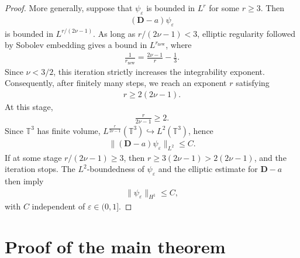 \documentclass[11pt,final]{amsart}
\newcommand{\T}{\mathbb{T}}
\newcommand{\eps}{\varepsilon}
\newcommand{\pD}{\mathbf{D}}
\begin{document}
\begin{proof}
More generally, suppose that $\psi_\eps$ is bounded in $L^r$ for
some $r\ge3$. Then
\begin{align}
(\pD-a)\psi_\eps
\end{align}
is bounded in $L^{r/(2\nu-1)}$. As long as
$r/(2\nu-1)<3$, elliptic regularity followed by Sobolev embedding gives a
bound in $L^{r_{\mathrm{new}}}$, where
\begin{align}
\frac1{r_{\mathrm{new}}}
=
\frac{2\nu-1}{r}-\frac13.
\end{align}
Since $\nu<3/2$, this iteration strictly increases the integrability
exponent. Consequently, after finitely many steps, we reach an exponent
$r$ satisfying
\begin{align}
r\ge 2(2\nu-1).
\end{align}
At this stage,
\begin{align}
\frac{r}{2\nu-1}\ge2.
\end{align}
Since $\T^3$ has finite volume, $L^\frac{r}{2\nu-1}(\T^3)\hookrightarrow L^2(\T^3)$, hence
\begin{align}
\|(\pD-a)\psi_\eps\|_{L^2}\le C.
\end{align}
If at some stage $r/(2\nu-1)\ge3$, then $r\ge3(2\nu-1)>2(2\nu-1)$, and the iteration stops. The $L^2$-boundedness of $\psi_\eps$ and the elliptic estimate for
$\pD-a$ then imply
\begin{align}
\|\psi_\eps\|_{H^1}\le C,
\end{align}
with $C$ independent of $\eps\in(0,1]$.

\end{proof}









\section{Proof of the main theorem}\label{sect:last}
\end{document}
